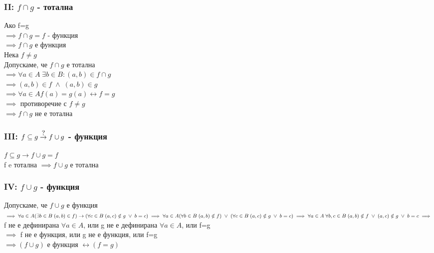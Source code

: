 \documentclass[10pt,a4paper]{article}
\newcommand\isimplies{\stackrel{\mathclap{\normalfont\mbox{?}}}{\rightarrow}}
\newcommand\sland{\;\land\;}
\newcommand\slor{\;\lor\;}
\begin{document}
\subsubsection*{II: $f \cap g$ - тотална}

Ако f=g \\
$\implies f \cap g = f$ - функция \\
$\implies f \cap g$ е функция \\

Нека $f \neq g$ \\
Допускаме, че $f \cap g$ е тотална \\
$\implies \forall a \in A \; \exists b \in B: (a,b) \in f \cap g$ \\
$\implies (a,b) \in f \sland (a,b) \in g$\\
$\implies \forall a \in A f(a)=g(a) \leftrightarrow f=g$\\
$\implies$ противоречие с $f \neq g$\\
$\implies f \cap g$ не е тотална\\

\subsubsection*{III: $f \subseteq g \isimplies f \cup g$ - функция}

$f \subseteq g \rightarrow f \cup g = f$\\
f e тотална $\implies f\cup g $ е тотална \\

\subsubsection*{IV: $f \cup g$ - функция}
Допускаме, че $f \cup g$ е функция \\
$
\implies \forall a \in A (\exists b \in B \; (a,b) \in f) \rightarrow (\forall c \in B \; (a,c) \notin g \slor b = c) \\
\implies \forall a \in A (\forall b \in B \; (a,b) \notin f) \slor (\forall c \in B \; (a,c) \notin g \slor b=c) \\
\implies \forall a \in A \; \forall b,c \in B \; (a,b) \notin f \slor (a,c) \notin g \slor b=c \\
\implies$ f не е дефинирана $\forall a \in A$, или g не е дефинирана $\forall a \in A$, или f=g \\
$\implies$ f не е функция, или g не е функция, или f=g \\
$\implies (f \cup g)$ е функция $ \leftrightarrow (f = g)$\\
\end{document}
